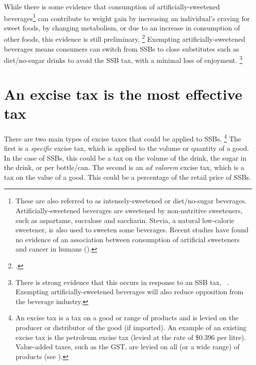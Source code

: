 \documentclass[embargoed]{grattan}
\begin{document}
While there is some evidence that consumption of artificially-sweetened beverages\footnote{These are also referred to as intensely-sweetened or diet/no-sugar beverages.
Artificially-sweetened beverages are sweetened by non-nutritive sweeteners, such as aspartame, sucralose and saccharin.
Stevia, a natural low-calorie sweetener, is also used to sweeten some beverages.
Recent studies have found no evidence of an association between consumption of artificial sweeteners and cancer in humans (\textcites{Institute2009ArtificialSweetenersCancer}{CancerCouncil2015Artificialsweetenersdo}).} can contribute to weight gain by increasing an individual's craving for sweet foods, by changing metabolism, or due to an increase in consumption of other foods, this evidence is still preliminary.%
\footcites{Mattes2009Nonnutritivesweetenerconsumption}{Popkin2012Sugarybeveragesrepresent}{Yang2010Gainweightgoing}{Swithers2013Artificialsweetenersproduce}{Green2012Alteredprocessingsweet}{Fowler2008Fuelingobesityepidemic}{Friedman2012Sugarsweetenedbeverage} Exempting artificially-sweetened beverages means consumers can switch from SSBs to close substitutes such as diet/no-sugar drinks to avoid the SSB tax, with a minimal loss of enjoyment.%
\footnote{There is strong evidence that this occurs in response to an SSB tax, \eg~\textcites{Colchero2016Beveragepurchasesstores}{Briggs2013Overallincomespecific}{Sharma2014effectstaxingsugarsweetened}{Zhen2010Habitformationdemand}.
Exempting artificially-sweetened beverages will also reduce opposition from the beverage industry.}

\section{An excise tax is the most effective tax}\label{an-excise-tax-is-the-most-effective-tax}

There are two main types of excise taxes that could be applied to SSBs.%
\footnote{An excise tax is a tax on a good or range of products and is levied on the producer or distributor of the good (if imported).
An example of an existing excise tax is the petroleum excise tax (levied at the rate of \$0.396 per litre).
Value-added taxes, such as the GST, are levied on all (or a wide range) of products (see \textcite{CnossenExcisetaxationAustralia}).} The first is a \emph{specific} excise tax, which is applied to the volume or quantity of a good.
In the case of SSBs, this could be a tax on the volume of the drink, the sugar in the drink, or per bottle/can.
The second is an \emph{ad valorem} excise tax, which is a tax on the value of a good.
This could be a percentage of the retail price of SSBs.
\end{document}
